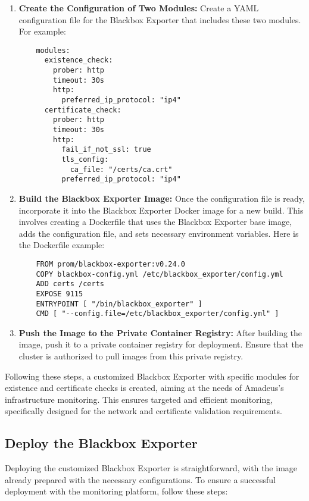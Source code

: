 \begin{enumerate}
    \item \textbf{Create the Configuration of Two Modules:}
    Create a YAML configuration file for the Blackbox Exporter that includes these two modules. For example:
    \begin{verbatim}
    modules:
      existence_check:
        prober: http
        timeout: 30s
        http:
          preferred_ip_protocol: "ip4"
      certificate_check: 
        prober: http
        timeout: 30s
        http:
          fail_if_not_ssl: true
          tls_config:
            ca_file: "/certs/ca.crt"
          preferred_ip_protocol: "ip4"
    \end{verbatim}
    \item \textbf{Build the Blackbox Exporter Image:}
    Once the configuration file is ready, incorporate it into the Blackbox Exporter Docker image for a new build. This involves creating a Dockerfile that uses the Blackbox Exporter base image, adds the configuration file, and sets necessary environment variables. Here is the Dockerfile example: 
    \begin{verbatim}
    FROM prom/blackbox-exporter:v0.24.0
    COPY blackbox-config.yml /etc/blackbox_exporter/config.yml
    ADD certs /certs
    EXPOSE 9115
    ENTRYPOINT [ "/bin/blackbox_exporter" ]
    CMD [ "--config.file=/etc/blackbox_exporter/config.yml" ]
    \end{verbatim}
    \item \textbf{Push the Image to the Private Container Registry:}
    After building the image, push it to a private container registry for deployment. Ensure that the cluster is authorized to pull images from this private registry. 
\end{enumerate}

Following these steps, a customized Blackbox Exporter with specific modules for existence and certificate checks is created, aiming at the needs of Amadeus's infrastructure monitoring. This ensures targeted and efficient monitoring, specifically designed for the network and certificate validation requirements. 

\subsection{Deploy the Blackbox Exporter}

Deploying the customized Blackbox Exporter is straightforward, with the image already prepared with the necessary configurations. To ensure a successful deployment with the monitoring platform, follow these steps: 

